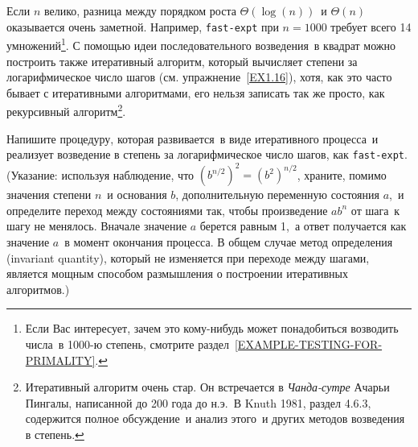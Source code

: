 Если $n$ велико, разница между
порядком роста $\Theta(\log(n))$~и $\Theta(n)$
оказывается очень заметной.  Например, {\tt fast-expt} при
$n = 1000$ требует всего 14 умножений\footnote{Если Вас интересует, зачем это кому-нибудь
может понадобиться возводить числа~в 1000-ю степень, смотрите раздел~\ref{EXAMPLE-TESTING-FOR-PRIMALITY}.
}.
С помощью идеи последовательного возведения~в квадрат можно
построить также итеративный алгоритм, который вычисляет
степени за логарифмическое число шагов (см. упражнение~\ref{EX1.16}), хотя, как это часто бывает с
итеративными алгоритмами, его нельзя записать так же просто, как
рекурсивный алгоритм\footnote{Итеративный алгоритм очень стар. Он встречается в
{\em{} Чанда-сутре}  Ачарьи
Пингалы, 
написанной до 200 года до н.э.~В Knuth 1981,
раздел 4.6.3, содержится
полное обсуждение~и анализ этого~и других методов возведения в
степень.}.

\begin{exercise}{1.16}\label{EX1.16}%
Напишите процедуру, которая развивается~в виде
итеративного процесса~и реализует возведение в
степень за логарифмическое число шагов, как
{\tt fast-expt}. (Указание: используя наблюдение, что
$(b^{n / 2})^2 = (b^2)^{n / 2}$, храните, помимо
значения степени $n$~и основания $b$,
дополнительную переменную состояния $a$,~и определите
переход между состояниями так, чтобы произведение $ab^n$ от 
шага~к шагу не менялось.  Вначале значение $a$ берется
равным 1,~а ответ получается как значение $a$~в момент
окончания процесса. В общем случае метод определения 
 (invariant quantity), 
который не изменяется при
переходе между шагами, является мощным способом размышления о
построении итеративных алгоритмов.)

\sloppy
\end{exercise}

